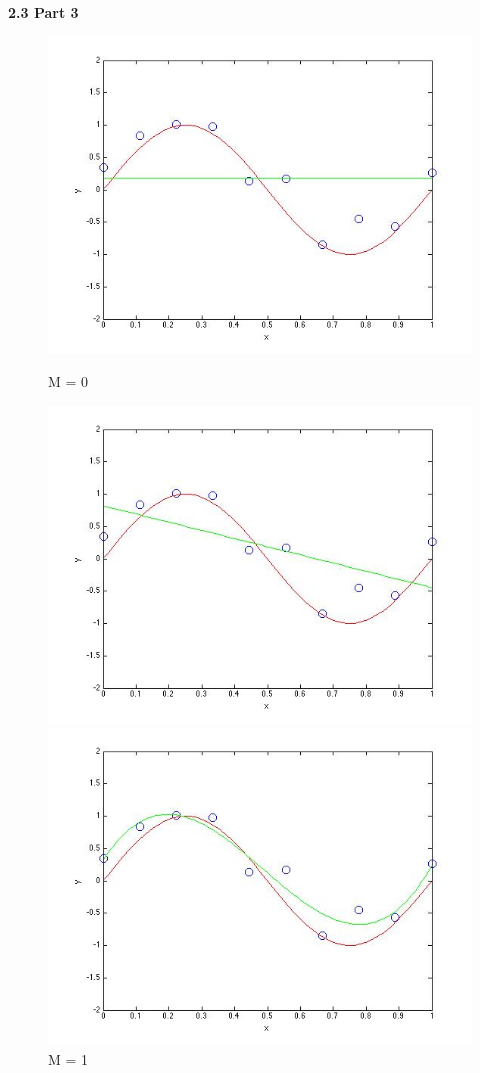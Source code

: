 {\bfseries 2.3 Part 3}
\begin{figure}[!htb]
  \includegraphics[width=\linewidth]{figures/p2_M=0}
  \caption{M = 0}\label{fig:figures/p2_M=0}
\endminipage\hfill
{}
  \includegraphics[width=\linewidth]{figures/p2_M=1}
  \caption{M = 1}\label{fig:figures/p2_M=1}
\endminipage\hfill
{}                                                                            
  \includegraphics[width=\linewidth]{figures/p2_M=3}

\end{figure}
